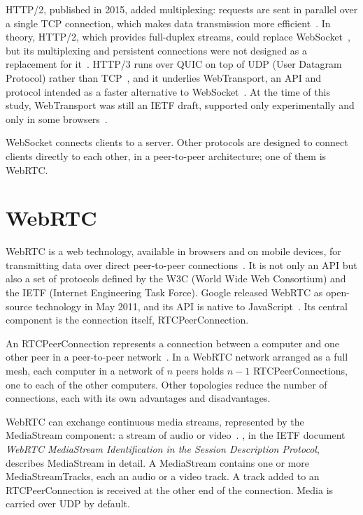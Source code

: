 HTTP/2, published in 2015, added multiplexing: requests are sent in parallel over a single TCP connection, which makes data transmission more efficient~\citep{belshe2015hypertext}. In theory, HTTP/2, which provides full-duplex streams, could replace WebSocket~\citep{stenberg2014http2}, but its multiplexing and persistent connections were not designed as a replacement for it~\citep{fietze2017http}. HTTP/3 runs over QUIC on top of UDP (User Datagram Protocol) rather than TCP~\citep{rfc9114}, and it underlies WebTransport, an API and protocol intended as a faster alternative to WebSocket~\citep{ietf-webtrans-http3-03}. At the time of this study, WebTransport was still an IETF draft, supported only experimentally and only in some browsers~\citep{ietf-webtrans-http3-03}.

WebSocket connects clients to a server. Other protocols are designed to connect clients directly to each other, in a peer-to-peer architecture; one of them is WebRTC.

\section{WebRTC}

WebRTC is a web technology, available in browsers and on mobile devices, for transmitting data over direct peer-to-peer connections~\citep{rfc8835}. It is not only an API but also a set of protocols defined by the W3C (World Wide Web Consortium) and the IETF (Internet Engineering Task Force). Google released WebRTC as open-source technology in May 2011, and its API is native to JavaScript~\citep{dutton2012getting}. Its central component is the connection itself, RTCPeerConnection.

An RTCPeerConnection represents a connection between a computer and one other peer in a peer-to-peer network~\citep{rfc8835, rfc8834, jennings2013real}. In a WebRTC network arranged as a full mesh, each computer in a network of $n$ peers holds $n-1$ RTCPeerConnections, one to each of the other computers. Other topologies reduce the number of connections, each with its own advantages and disadvantages.

WebRTC can exchange continuous media streams, represented by the MediaStream component: a stream of audio or video~\citep{sredojev2015webrtc, rfc8835}. \citet{rfc8830}, in the IETF document \emph{WebRTC MediaStream Identification in the Session Description Protocol}, describes MediaStream in detail. A MediaStream contains one or more MediaStreamTracks, each an audio or a video track. A track added to an RTCPeerConnection is received at the other end of the connection. Media is carried over UDP by default.

